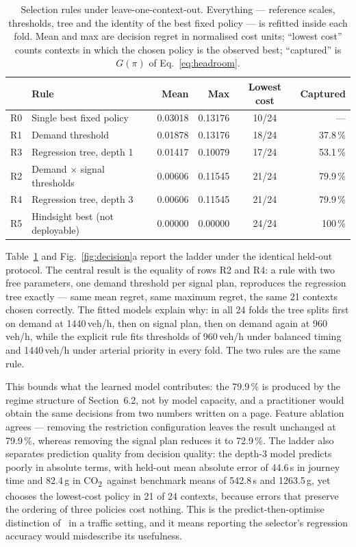 \documentclass[runningheads]{llncs}
\newcommand{\CO}{CO\textsubscript{2}}
\begin{document}
\begin{table}[htb]
\centering\small
\caption{Selection rules under leave-one-context-out. Everything --- reference scales,
thresholds, tree and the identity of the best fixed policy --- is refitted inside each
fold. Mean and max are decision regret in normalised cost units; ``lowest cost'' counts
contexts in which the chosen policy is the observed best; ``captured'' is $G(\pi)$ of
Eq.~\eqref{eq:headroom}.}
\label{tab:ladder}
\begin{tabular}{@{}llrrcr@{}}
\toprule
& Rule & Mean & Max & Lowest cost & Captured\\
\midrule
R0 & Single best fixed policy & 0.03018 & 0.13176 & 10/24 & ---\\
R1 & Demand threshold & 0.01878 & 0.13176 & 18/24 & 37.8\,\%\\
R3 & Regression tree, depth 1 & 0.01417 & 0.10079 & 17/24 & 53.1\,\%\\
R2 & Demand $\times$ signal thresholds & 0.00606 & 0.11545 & 21/24 & 79.9\,\%\\
R4 & Regression tree, depth 3 & 0.00606 & 0.11545 & 21/24 & 79.9\,\%\\
R5 & Hindsight best (not deployable) & 0.00000 & 0.00000 & 24/24 & 100\,\%\\
\bottomrule
\end{tabular}
\end{table}

Table~\ref{tab:ladder} and Fig.~\ref{fig:decision}a report the ladder under the identical
held-out protocol. The central result is the equality of rows R2 and R4: a rule with two
free parameters, one demand threshold per signal plan, reproduces the regression tree
exactly --- same mean regret, same maximum regret, the same 21 contexts chosen correctly.
The fitted models explain why: in all 24 folds the tree splits first on demand at
1440\,veh/h, then on signal plan, then on demand again at 960\,veh/h, while the explicit
rule fits thresholds of 960\,veh/h under balanced timing and 1440\,veh/h under arterial
priority in every fold. The two rules are the same rule.

This bounds what the learned model contributes: the 79.9\,\% is produced by the regime
structure of Section~6.2, not by model capacity, and a practitioner would obtain the same
decisions from two numbers written on a page. Feature ablation agrees --- removing the
restriction configuration leaves the result unchanged at 79.9\,\%, whereas removing the
signal plan reduces it to 72.9\,\%. The ladder also separates prediction quality from
decision quality: the depth-3 model predicts poorly in absolute terms, with held-out mean
absolute error of 44.6\,s in journey time and 82.4\,g in \CO\ against benchmark means of
542.8\,s and 1263.5\,g, yet chooses the lowest-cost policy in 21 of 24 contexts, because
errors that preserve the ordering of three policies cost nothing. This is the
predict-then-optimise distinction of~\cite{elmachtoub2022smart} in a traffic setting, and
it means reporting the selector's regression accuracy would misdescribe its usefulness.
\end{document}
